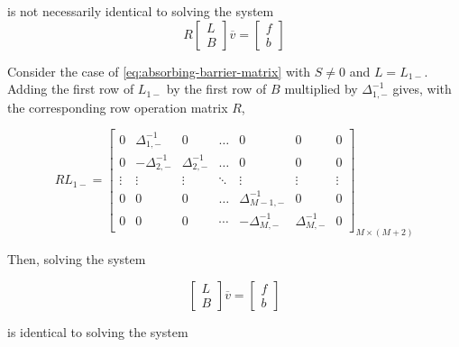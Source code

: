 \documentclass[11pt]{article}
\theoremstyle{definition}
\begin{document}
is not necessarily identical to solving the system
\begin{equation}
R \begin{bmatrix}
 L \\
 B
\end{bmatrix} 
\overline{v}
=
\begin{bmatrix}
f \\
b
\end{bmatrix}
\end{equation}


Consider the case of \cref{eq:absorbing-barrier-matrix} with $S\neq 0$ and $L = L_{1-}$. Adding the first row of $L_{1-}$ by the first row of $B$ multiplied by $\Delta_{1,-}^{-1}$ gives, with the corresponding row operation matrix $R$, 

\begin{equation}
R {L}_{1-} = \begin{bmatrix}
0&\Delta_{1,-}^{-1} &0&\dots&0&0&0\\
0&-\Delta_{2,-}^{-1}&\Delta_{2,-}^{-1}&\dots&0&0&0\\
\vdots&\vdots&\vdots&\ddots&\vdots&\vdots&\vdots\\
0&0&0&\dots&\Delta_{M-1,-}^{-1}&0&0\\
0&0&0&\cdots&-\Delta_{M,-}^{-1}&\Delta_{M,-}^{-1}&0
\end{bmatrix}_{M\times (M+2)}
\end{equation}

Then, solving the system 

\begin{equation}
\begin{bmatrix}
 L \\
 B
\end{bmatrix} 
\overline{v} 
=
\begin{bmatrix}
f \\
b
\end{bmatrix}
\end{equation}

is identical to solving the system
\end{document}
